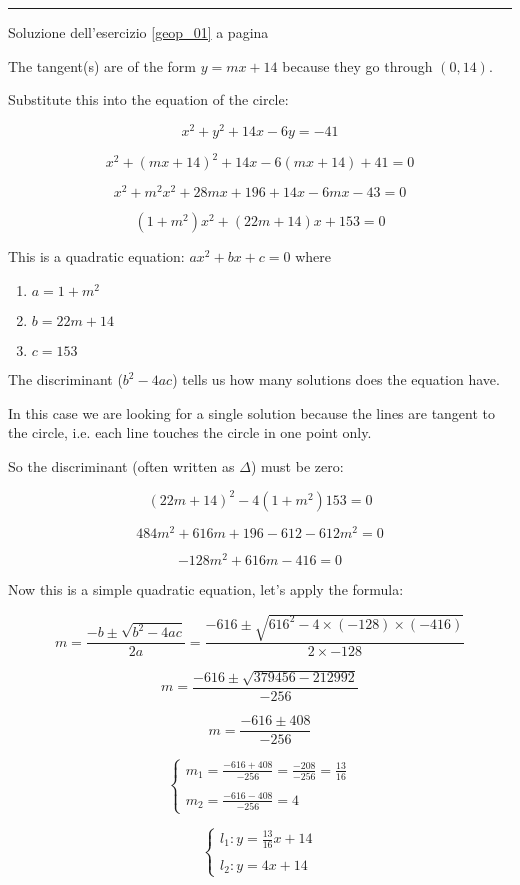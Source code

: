 \vspace{1cm}
\hrule
\vspace{1cm}


Soluzione dell'esercizio \ref{geop_01} a pagina \pageref{geop_01}\label{geos_01}

The tangent(s) are of the form $y = mx + 14$ because they go through $(0,14)$.

Substitute this into the equation of the circle:


\[
x^2+y^2+14x-6y=-41
\]

\[
x^2+(mx+14)^2+14x-6(mx+14)+41=0
\]


\[
x^2+m^2x^2+28mx+196+14x-6mx-43=0
\]

\[
(1+m^2)x^2+(22m+14)x+153=0
\]

This is a quadratic equation: $ax^2+bx+c=0$
where
\begin{enumerate}
\item $a=1+m^2$
\item $b=22m+14$
\item $c=153$
\end{enumerate}

The discriminant ($b^2-4ac$) tells us how many solutions does the equation have.

In this case we are looking for a single solution because the lines are tangent to the circle, i.e. each line touches the circle in one point only.

So the discriminant (often written as $\Delta$) must be zero:

\[
(22m+14)^2-4(1+m^2)153=0
\]

\[
484m^2+616m+196-612-612m^2=0
\]

\[
-128m^2+616m-416=0
\]

Now this is a simple quadratic equation, let's apply the formula:

\[
m=\frac{-b\pm\sqrt{b^2-4ac}}{2a}=\frac{-616\pm \sqrt{616^2-4\times(-128)\times(-416)}}{2\times -128}
\]


\[
m=\frac{-616\pm \sqrt{379456-212992}}{-256}
\]


\[
m=\frac{-616\pm 408}{-256}
\]

\[
\left\{
\begin{array}{ll}
m_1=\frac{-616+408}{-256}=\frac{-208}{-256}=\frac{13}{16}\\
\\
m_2=\frac{-616-408}{-256}=4
\end{array}
\right.
\]

\[
\left\{
\begin{array}{ll}
l_1: y=\frac{13}{16}x+14\\
\\
l_2: y=4x+14
\end{array}
\right.
\]

